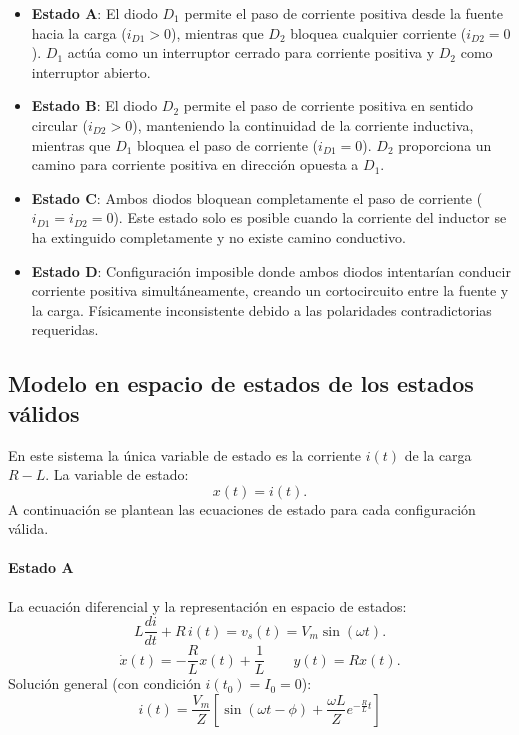 \documentclass[conference]{IEEEtran}
\begin{document}
\begin{itemize}
      \item \textbf{Estado A}: 
      El diodo $D_1$ permite el paso de corriente positiva desde la fuente hacia la carga ($i_{D1} > 0$), mientras que $D_2$ bloquea cualquier corriente ($i_{D2} = 0$). $D_1$ actúa como un interruptor cerrado para corriente positiva y $D_2$ como interruptor abierto.

      \item \textbf{Estado B}: 
      El diodo $D_2$ permite el paso de corriente positiva en sentido circular ($i_{D2} > 0$), manteniendo la continuidad de la corriente inductiva, mientras que $D_1$ bloquea el paso de corriente ($i_{D1} = 0$). $D_2$ proporciona un camino para corriente positiva en dirección opuesta a $D_1$.

      \item \textbf{Estado C}: 
      Ambos diodos bloquean completamente el paso de corriente ($i_{D1} = i_{D2} = 0$). Este estado solo es posible cuando la corriente del inductor se ha extinguido completamente y no existe camino conductivo.

      \item \textbf{Estado D}: 
      Configuración imposible donde ambos diodos intentarían conducir corriente positiva simultáneamente, creando un cortocircuito entre la fuente y la carga. Físicamente inconsistente debido a las polaridades contradictorias requeridas.
\end{itemize}
 


\subsection{Modelo en espacio de estados de los estados válidos }
En este sistema la única variable de estado es la corriente \(i(t)\) de la carga \(R\!-\!L\). La variable de estado:
\[
x(t)=i(t).
\]
A continuación se plantean las ecuaciones de estado para cada configuración válida.

\paragraph{Estado A}
La ecuación diferencial y la representación en espacio de estados:
\[
L\frac{di}{dt} + R\,i(t) = v_s(t) = V_m\sin(\omega t).
\]
\[
\dot{x}(t)
=
-\dfrac{R}{L}
x(t)
+
\dfrac{1}{L}
\qquad
y(t)=Rx(t).
\]
Solución general (con condición \(i(t_0)=I_0=0\)):
\begin{equation}
i(t) = \frac{V_m}{Z} \left[ \sin(\omega t - \phi) + \frac{\omega L}{Z} e^{-\frac{R}{L}t} \right]
\label{ecu1}
\end{equation}
\end{document}
